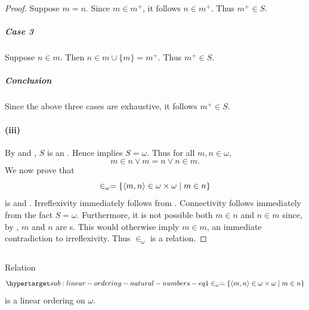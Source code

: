 \documentclass{report}
\begin{document}
\begin{proof}
        Suppose $m = n$.
        Since $m \in m^+$, it follows $n \in m^+$.
        Thus $m^+ \in S$.

      \subparagraph{Case 3}%

        Suppose $n \in m$.
        Then $n \in m \cup \{m\} = m^+$.
        Thus $m^+ \in S$.

      \subparagraph{Conclusion}%

        Since the above three cases are exhaustive, it follows $m^+ \in S$.

    \paragraph{(iii)}%

      By  and
        , $S$ is an
        .
      Hence  implies $S = \omega$.
      Thus for all $m, n \in \omega$, $$m \in n \lor m = n \lor n \in m.$$
      We now prove that
        $$\in_\omega = \{\left< m, n \right> \in \omega \times \omega \mid m \in n\}$$
        is  and .
      Irreflexivity immediately follows from .
      Connectivity follows immediately from the fact $S = \omega$.
      Furthermore, it is not possible both $m \in n$ and $n \in m$ since, by
        , $m$ and $n$ are s.
      This would otherwise imply $m \in m$, an immediate contradiction to
        irreflexivity.
      Thus $\in_\omega$ is a  relation.

  \end{proof}

\subsection{}%

  \begin{theorem}
    Relation
      \begin{equation}
        \hyperlabel{sub:linear-ordering-natural-numbers-eq1}
        \in_\omega = \{\tuple{m, n} \in \omega \times \omega \mid m \in n\}
      \end{equation}
      is a linear ordering on $\omega$.
  \end{theorem}
\end{document}
